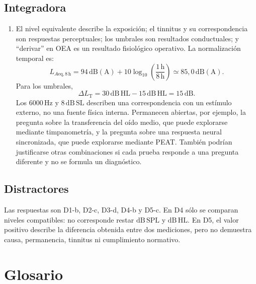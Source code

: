 \subsection*{Integradora}

\begin{enumerate}[label=\textbf{INT\arabic*.},leftmargin=*]
    \item El nivel equivalente describe la exposición; el tinnitus y su
    correspondencia son respuestas perceptuales; los umbrales son resultados
    conductuales; y ``derivar'' en OEA es un resultado fisiológico operativo.
    La normalización temporal es:
    \[
        L_{A\mathrm{eq},8\,\mathrm{h}}
        =
        94\,\mathrm{dB(A)}
        +10\log_{10}\left(\frac{1\,\mathrm{h}}{8\,\mathrm{h}}\right)
        \simeq 85{,}0\,\mathrm{dB(A)}.
    \]
    Para los umbrales,
    \[
        \Delta L_{\mathrm{T}}
        =
        30\,\mathrm{dB\,HL}-15\,\mathrm{dB\,HL}
        =
        15\,\mathrm{dB}.
    \]
    Los \(6000\,\mathrm{Hz}\) y \(8\,\mathrm{dB\,SL}\) describen una
    correspondencia con un estímulo externo, no una fuente física interna.
    Permanecen abiertas, por ejemplo, la pregunta sobre la transferencia del
    oído medio, que puede explorarse mediante timpanometría, y la pregunta
    sobre una respuesta neural sincronizada, que puede explorarse mediante
    PEAT. También podrían justificarse otras combinaciones si cada prueba
    responde a una pregunta diferente y no se formula un diagnóstico.
\end{enumerate}

\subsection*{Distractores}

Las respuestas son D1-b, D2-c, D3-d, D4-b y D5-c. En D4 sólo se comparan
niveles compatibles: no corresponde restar \(\mathrm{dB\,SPL}\) y
\(\mathrm{dB\,HL}\). En D5, el valor positivo describe la diferencia obtenida
entre dos mediciones, pero no demuestra causa, permanencia, tinnitus ni
cumplimiento normativo.

\section{Glosario}
\label{sec:u8-glosario}

